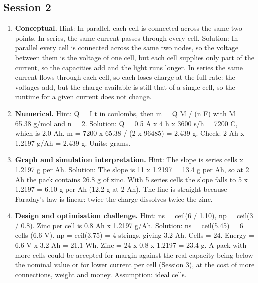 \documentclass[11pt,a4paper]{article}
\begin{document}
\subsection*{Session 2}
\begin{enumerate}[nosep]
\item \textbf{Conceptual.} Hint: In parallel, each cell is connected across the same two points. In series, the same current passes through every cell. Solution: In parallel every cell is connected across the same two nodes, so the voltage between them is the voltage of one cell, but each cell supplies only part of the current, so the capacities add and the light runs longer. In series the same current flows through each cell, so each loses charge at the full rate: the voltages add, but the charge available is still that of a single cell, so the runtime for a given current does not change.
\item \textbf{Numerical.} Hint: Q = I t in coulombs, then m = Q M / (n F) with M = 65.38 g/mol and n = 2. Solution: Q = 0.5 A x 4 h x 3600 s/h = 7200 C, which is 2.0 Ah. m = 7200 x 65.38 / (2 x 96485) = 2.439 g. Check: 2 Ah x 1.2197 g/Ah = 2.439 g. Units: grams.
\item \textbf{Graph and simulation interpretation.} Hint: The slope is series cells x 1.2197 g per Ah. Solution: The slope is 11 x 1.2197 = 13.4 g per Ah, so at 2 Ah the pack contains 26.8 g of zinc. With 5 series cells the slope falls to 5 x 1.2197 = 6.10 g per Ah (12.2 g at 2 Ah). The line is straight because Faraday's law is linear: twice the charge dissolves twice the zinc.
\item \textbf{Design and optimisation challenge.} Hint: ns = ceil(6 / 1.10), np = ceil(3 / 0.8). Zinc per cell is 0.8 Ah x 1.2197 g/Ah. Solution: ns = ceil(5.45) = 6 cells (6.6 V). np = ceil(3.75) = 4 strings, giving 3.2 Ah. Cells = 24. Energy = 6.6 V x 3.2 Ah = 21.1 Wh. Zinc = 24 x 0.8 x 1.2197 = 23.4 g. A pack with more cells could be accepted for margin against the real capacity being below the nominal value or for lower current per cell (Session 3), at the cost of more connections, weight and money. Assumption: ideal cells.
\end{enumerate}
\end{document}
